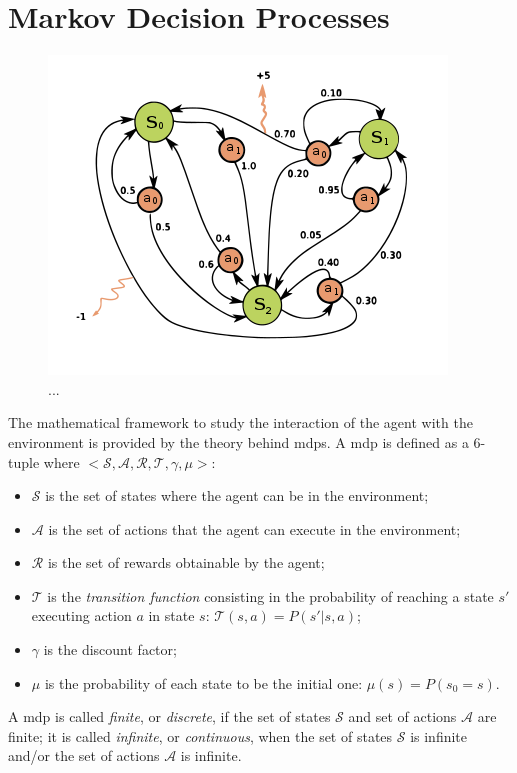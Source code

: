 \section{Markov Decision Processes}
\begin{figure}[t]
\begin{minipage}{\textwidth}
\begin{center}
  \includegraphics[scale=.6]{img/mdp2.png}
\end{center}
\end{minipage}
\caption[Markov Decision Process]{...}\label{F:mdp2}
\end{figure}
The mathematical framework to study the interaction of the agent with the environment is provided by the theory behind \glspl{mdp}. A \gls{mdp} is defined as a $6$-tuple where $<\mathcal{S}, \mathcal{A}, \mathcal{R}, \mathcal{T}, \gamma, \mu>$:
\begin{itemize}
 \item $\mathcal{S}$ is the set of states where the agent can be in the environment;
 \item $\mathcal{A}$ is the set of actions that the agent can execute in the environment;
 \item $\mathcal{R}$ is the set of rewards obtainable by the agent;
 \item $\mathcal{T}$ is the \textit{transition function} consisting in the probability of reaching a state $s'$ executing action $a$ in state $s$: $\mathcal{T}(s, a) = P(s' | s, a)$;
 \item $\gamma$ is the discount factor;
 \item $\mu$ is the probability of each state to be the initial one: $\mu(s) = P(s_0 = s)$.
\end{itemize}
A \gls{mdp} is called \textit{finite}, or \textit{discrete}, if the set of states $\mathcal{S}$ and set of actions $\mathcal{A}$ are finite; it is called \textit{infinite}, or \textit{continuous}, when the set of states $\mathcal{S}$ is infinite and/or the set of actions $\mathcal{A}$ is infinite.

